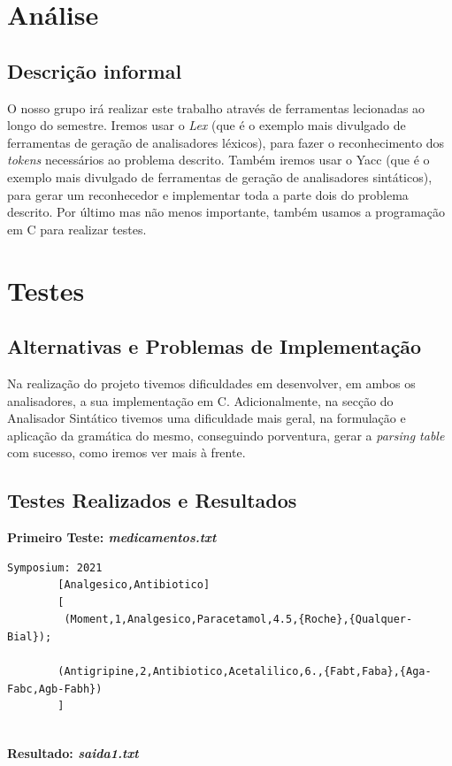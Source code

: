 \documentclass{article}
\begin{document}
\pagebreak

\section{Análise}
\subsection{Descrição informal}
\hspace*{1.5em}O nosso grupo irá realizar este trabalho através de ferramentas lecionadas ao longo do semestre.
Iremos usar o \emph{Lex} (que é o exemplo mais divulgado de ferramentas de geração de analisadores léxicos), para fazer o reconhecimento dos \emph{tokens} necessários ao problema descrito.
Também iremos usar o Yacc (que é o exemplo mais divulgado de ferramentas de geração de analisadores sintáticos), para gerar um reconhecedor e implementar toda a parte dois do problema descrito.
Por último mas não menos importante, também usamos a programação em C para realizar testes.

\vspace{10cm}

\section{Testes}
\subsection{Alternativas e Problemas de Implementação}

\hspace*{1.5em}Na realização do projeto tivemos dificuldades em desenvolver, em ambos os analisadores, a sua implementação em C. Adicionalmente, na secção do Analisador Sintático tivemos uma dificuldade mais geral, na formulação e aplicação da gramática do mesmo, conseguindo porventura, gerar a \emph{parsing table} com sucesso, como iremos ver mais à frente.


\subsection{Testes Realizados e Resultados}
\newcommand{\keyword}[1]{\textbf{#1}}
\newcommand{\tabhead}[1]{\textbf{#1}}
\newcommand{\code}[1]{\texttt{#1}}
\newcommand{\file}[1]{\texttt{\bfseries#1}}
\newcommand{\option}[1]{\texttt{\itshape#1}}

\large\textbf{Primeiro Teste: \emph{medicamentos.txt}}
\begin{lstlisting}[style=CStyle]
Symposium: 2021
		[Analgesico,Antibiotico]
		[
		 (Moment,1,Analgesico,Paracetamol,4.5,{Roche},{Qualquer-Bial});

		(Antigripine,2,Antibiotico,Acetalilico,6.,{Fabt,Faba},{Aga-Fabc,Agb-Fabh})  
		]
    
\end{lstlisting}
\par
\normalsize\textbf{Resultado: \emph{saida1.txt}}
\end{document}
